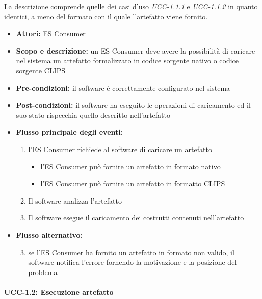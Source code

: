 La descrizione comprende quelle dei casi d'uso \emph{UCC-1.1.1} e \emph{UCC-1.1.2} in quanto identici, a meno del formato con il quale l'artefatto viene fornito.

\begin{itemize}
	\item \textbf{Attori:} ES Consumer
	\item \textbf{Scopo e descrizione:} un ES Consumer deve avere la possibilità di caricare nel sistema un artefatto formalizzato in codice sorgente nativo o codice sorgente CLIPS
	\item \textbf{Pre-condizioni:} il software è correttamente configurato nel sistema
	\item \textbf{Post-condizioni:} il software ha eseguito le operazioni di caricamento ed il suo stato rispecchia quello descritto nell'artefatto
	\item \textbf{Flusso principale degli eventi:}
		\begin{enumerate}
			\item l'ES Consumer richiede al software di caricare un artefatto
			\begin{itemize}
				\item l'ES Consumer può fornire un artefatto in formato nativo
				\item l'ES Consumer può fornire un artefatto in formatto CLIPS
			\end{itemize}
			\item Il software analizza l'artefatto
			\item Il software esegue il caricamento dei costrutti contenuti nell'artefatto
		\end{enumerate}
	\item \textbf{Flusso alternativo:}
		\begin{enumerate}
			\setcounter{enumi}{2}
			\item se l'ES Consumer ha fornito un artefatto in formato non valido, il software notifica l'errore fornendo la motivazione e la posizione del problema
		\end{enumerate}
\end{itemize}

\paragraph{UCC-1.2: Esecuzione artefatto}

